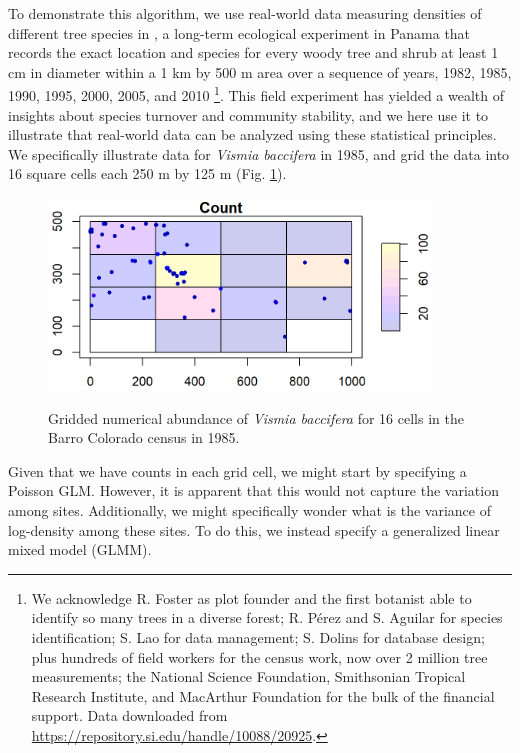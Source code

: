 To demonstrate this algorithm, we use real-world data measuring densities of different tree species in , a long-term ecological experiment in Panama that records the exact location and species for every woody tree and shrub at least 1 cm in diameter within a 1 km by 500 m area over a sequence of years, 1982, 1985, 1990, 1995, 2000, 2005, and 2010  \cite{condit_dataset_2012}\footnote{We acknowledge R. Foster as plot founder and the first botanist able to identify so many trees in a diverse forest; R. Pérez and S. Aguilar for species identification; S. Lao for data management; S. Dolins for database design; plus hundreds of field workers for the census work, now over 2 million tree measurements; the National Science Foundation, Smithsonian Tropical Research Institute, and MacArthur Foundation for the bulk of the financial support. Data downloaded from \url{https://repository.si.edu/handle/10088/20925}.}.  This field experiment has yielded a wealth of insights about species turnover and community stability, and we here use it to illustrate that real-world data can be analyzed using these statistical principles.  We specifically illustrate data for \textit{Vismia baccifera} in 1985, and grid the data into 16 square cells each 250 m by 125 m (Fig. \ref{fig:Chap2_gridded}).

\begin{figure}[!ht]
    \caption[Gridded numerical abundance of \textit{Vismia baccifera} in Barro Colorado]{Gridded numerical abundance of \textit{Vismia baccifera} for 16 cells in the Barro Colorado census in 1985.}
    \centering
    \includegraphics[width=4in]{Chap_2/gridded_density.png}
    \label{fig:Chap2_gridded}
\end{figure}

Given that we have counts in each grid cell, we might start by specifying a Poisson GLM. However, it is apparent that this would not capture the variation among sites.  Additionally, we might specifically wonder what is the variance of log-density among these sites.  To do this, we instead specify a generalized linear mixed model (GLMM).  

